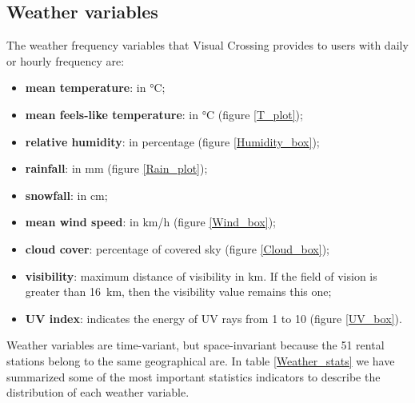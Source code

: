 \subsection{Weather variables}
The weather frequency variables that Visual Crossing provides to users with daily or hourly frequency are:
\begin{itemize}
	\item \textbf{mean temperature}: in \unit{\degreeCelsius};
	\item \textbf{mean feels-like temperature}: in \unit{\degreeCelsius} (figure \ref{T_plot});
	\item \textbf{relative humidity}: in percentage (figure \ref{Humidity_box});
	\item \textbf{rainfall}: in \unit{\milli\meter} (figure \ref{Rain_plot});
	\item \textbf{snowfall}: in \unit{\centi\meter};
	\item \textbf{mean wind speed}: in \unit{\kilo\meter/\hour} (figure \ref{Wind_box});
	\item \textbf{cloud cover}: percentage of covered sky (figure \ref{Cloud_box});
	\item \textbf{visibility}: maximum distance of visibility in \unit{\kilo\meter}. If the field of vision is greater than \SI{16}{\kilo\meter}, then the visibility value remains this one;
	\item \textbf{UV index}: indicates the energy of UV rays from \num{1} to \num{10} (figure \ref{UV_box}).
\end{itemize}
Weather variables are time-variant, but space-invariant because the \num{51} rental stations belong to the same geographical are. In table \ref{Weather_stats} we have summarized some of the most important statistics indicators to describe the distribution of each weather variable.

